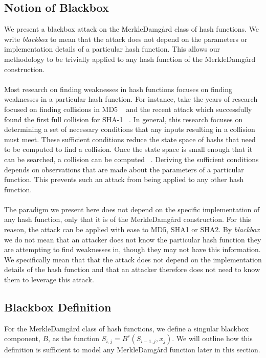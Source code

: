 \documentclass[letterpaper,twocolumn,10pt]{article}
\begin{document}
\subsection{Notion of Blackbox} \label{sec:sufcond}
We present a blackbox attack on the Merkle{\textendash}Damg\r{a}rd class of hash functions. We write \emph{blackbox} to mean that the attack does not depend on the parameters or implementation details of a particular hash function. This allows our methodology to be trivially applied to any hash function of the Merkle{\textendash}Damg\r{a}rd construction. 
\\
\\
Most research on finding weaknesses in hash functions focuses on finding weaknesses in a particular hash function. For instance, take the years of research focused on finding collisions in MD5 ~\cite{klima2005finding, liang2007improved, wang2005break, klima2006tunnels} and the recent attack which successfully found the first full collision for SHA-1 ~\cite{stevens2017first}. In general, this research focuses on determining a set of necessary conditions that any inputs resulting in a collision must meet. These sufficient conditions reduce the state space of hashs that need to be computed to find a collision. Once the state space is small enough that it can be searched, a collision can be computed ~\cite{sasaki2006construct}. Deriving the sufficient conditions depends on observations that are made about the parameters of a particular function. This prevents such an attack from being applied to any other hash function. 
\\
\\
The paradigm we present here does not depend on the specific implementation of any hash function, only that it is of the Merkle{\textendash}Damg\r{a}rd construction. For this reason, the attack can be applied with ease to MD5, SHA1 or SHA2. By \emph{blackbox} we do not mean that an attacker does not know the particular hash function they are attempting to find weaknesses in, though they may not have this information. We specifically mean that that the attack does not depend on the implementation details of the hash function and that an attacker therefore does not need to know them to leverage this attack. 

\subsection{Blackbox Definition} \label{bbdef}
For the Merkle{\textendash}Damg\r{a}rd class of hash functions, we define a singular blackbox component, $B$, as the function $S_{i,j} =  B^r(S_{i-1,j}, x_{j})$. We will outline how this definition is sufficient to model any Merkle{\textendash}Damg\r{a}rd function later in this section.
\end{document}
